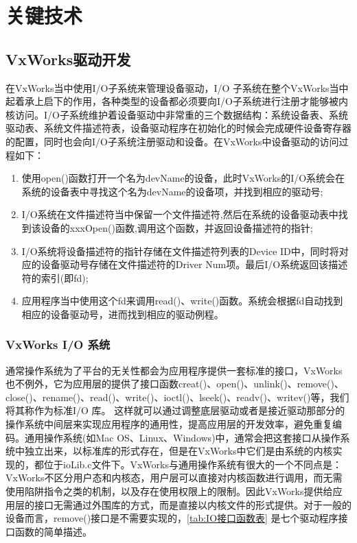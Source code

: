 \section{关键技术}

\subsection{VxWorks驱动开发}
	
	在VxWorks当中使用I/O子系统来管理设备驱动，I/O 子系统在整个VxWorks当中起着承上启下的作用，各种类型的设备都必须要向I/O子系统进行注册才能够被内核访问。I/O子系统维护着设备驱动中非常重的三个数据结构：系统设备表、系统驱动表、系统文件描述符表，设备驱动程序在初始化的时候会完成硬件设备寄存器的配置，同时也会向I/O子系统注册驱动和设备。在VxWorks中设备驱动的访问过程如下：
\begin{enumerate}
\item 使用open()函数打开一个名为devName的设备，此时VxWorks的I/O系统会在系统的设备表中寻找这个名为devName的设备项，并找到相应的驱动号; 
\item I/O系统在文件描述符当中保留一个文件描述符,然后在系统的设备驱动表中找到该设备的xxxOpen()函数,调用这个函数，并返回设备描述符的指针;
\item I/O系统将设备描述符的指针存储在文件描述符列表的Device ID中，同时将对应的设备驱动号存储在文件描述符的Driver Num项。最后I/O系统返回该描述符的索引(即fd);
\item 应用程序当中使用这个fd来调用read()、write()函数。系统会根据fd自动找到相应的设备驱动号，进而找到相应的驱动例程。 
\end{enumerate}

\subsubsection{VxWorks I/O 系统}
	通常操作系统为了平台的无关性都会为应用程序提供一套标准的接口，VxWorks也不例外，它为应用层的提供了接口函数creat()、open()、unlink()、remove()、close()、rename()、read()、write()、ioctl()、lseek()、readv()、writev()等，我们将其称作为标准I/O 库\cite{BSP开发人员指南}\cite{曹桂平2011VxWorks}。
	这样就可以通过调整底层驱动或者是接近驱动那部分的操作系统中间层来实现应用程序的通用性，提高应用层的开发效率，避免重复编码。通用操作系统(如Mac OS、Linux、Windows)中，通常会把这套接口从操作系统中独立出来，以标准库的形式存在，但是在VxWorks中它们是由系统的内核实现的，都位于ioLib.c文件下。VxWorks与通用操作系统有很大的一个不同点是：VxWorks不区分用户态和内核态，用户层可以直接对内核函数进行调用，而无需使用陷阱指令之类的机制，以及存在使用权限上的限制。因此VxWorks提供给应用层的接口无需通过外围库的方式，而是直接以内核文件的形式提供\cite{曹桂平2011VxWorks}。对于一般的设备而言，remove()接口是不需要实现的，\autoref{tab:IO接口函数表} 是七个驱动程序接口函数的简单描述。

